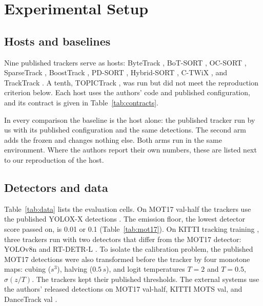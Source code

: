 \section{Experimental Setup}\label{sec:setup}

\subsection{Hosts and baselines}\label{sec:hosts}
Nine published trackers serve as hosts: ByteTrack \cite{zhang2022bytetrack},
BoT-SORT \cite{aharon2022botsort}, OC-SORT \cite{cao2023ocsort}, SparseTrack
\cite{liu2025sparsetrack}, BoostTrack \cite{stanojevic2024boosttrack},
PD-SORT \cite{wang2025pdsort}, Hybrid-SORT \cite{yang2024hybridsort},
C-TWiX \cite{miah2025twix}, and TrackTrack \cite{shim2025tracktrack}. A tenth,
TOPICTrack \cite{cao2025topictrack}, was run but did not meet the reproduction
criterion below. Each host uses the authors' code and published configuration,
and its contract is given in Table~\ref{tab:contracts}.

In every comparison the baseline is the host alone: the published tracker run
by us with its published configuration and the same detections. The second
arm adds the frozen \scl{} and changes nothing else. Both arms run in the same
environment. Where the authors report their own numbers, these are listed
next to our reproduction of the host.

\subsection{Detectors and data}\label{sec:data}
Table~\ref{tab:data} lists the evaluation cells. On MOT17 val-half
\cite{milan2016mot16} the trackers use the published YOLOX-X detections
\cite{ge2021yolox}. The emission floor, the lowest detector score passed on,
is 0.01 or 0.1 (Table~\ref{tab:mot17}). On KITTI tracking training \cite{geiger2012kitti}, three trackers run
with two detectors that differ from the MOT17 detector: YOLOv8n
\cite{jocher2023yolov8} and RT-DETR-L \cite{zhao2024rtdetr}. To isolate the
calibration problem, the published MOT17 detections were also transformed
before the tracker by four monotone maps: cubing ($s^3$), halving ($0.5\,s$),
and logit temperatures $T=2$ and $T=0.5$, $\sigma(z/T)$. The trackers kept
their published thresholds. The external systems use the authors' released
detections on MOT17 val-half, KITTI MOTS val, and DanceTrack val
\cite{sun2022dancetrack}.



